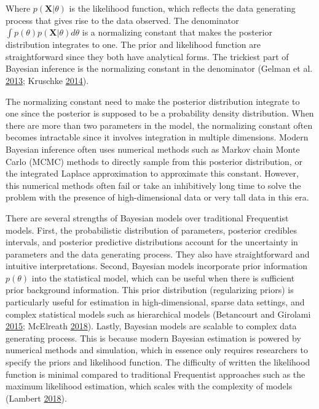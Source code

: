 \documentclass[12pt]{book}
\numberwithin{equation}{chapter}
\begin{document}
Where \(p(\mathbf{X}|\theta)\) is the likelihood function, which reflects the data generating process that gives rise to the data observed. The denominator \(\int p(\theta)p(\mathbf{X}|\theta)d\theta\) is a normalizing constant that makes the posterior distribution integrates to one. The prior and likelihood function are straightforward since they both have analytical forms. The trickiest part of Bayesian inference is the normalizing constant in the denominator (Gelman et al. \protect\hyperlink{ref-gelman2013bayesian}{2013}; Kruschke \protect\hyperlink{ref-kruschke2014doing}{2014}).

The normalizing constant need to make the posterior distribution integrate to one since the posterior is supposed to be a probability density distribution. When there are more than two parameters in the model, the normalizing constant often becomes intractable since it involves integration in multiple dimensions. Modern Bayesian inference often uses numerical methods such as Markov chain Monte Carlo (MCMC) methods to directly sample from this posterior distribution, or the integrated Laplace approximation to approximate this constant. However, this numerical methods often fail or take an inhibitively long time to solve the problem with the presence of high-dimensional data or very tall data in this era.

There are several strengths of Bayesian models over traditional Frequentist models. First, the probabilistic distribution of parameters, posterior credibles intervals, and posterior predictive distributions account for the uncertainty in parameters and the data generating process. They also have straightforward and intuitive interpretations. Second, Bayesian models incorporate prior information \(p(\theta)\) into the statistical model, which can be useful when there is sufficient prior background information. This prior distribution (regularizing priors) is particularly useful for estimation in high-dimensional, sparse data settings, and complex statistical models such as hierarchical models (Betancourt and Girolami \protect\hyperlink{ref-betancourt2015hamiltonian}{2015}; McElreath \protect\hyperlink{ref-mcelreath2018statistical}{2018}). Lastly, Bayesian models are scalable to complex data generating process. This is because modern Bayesian estimation is powered by numerical methods and simulation, which in essence only requires researchers to specify the priors and likelihood function. The difficulty of written the likelihood function is minimal compared to traditional Frequentist approaches such as the maximum likelihood estimation, which scales with the complexity of models (Lambert \protect\hyperlink{ref-lambert2018student}{2018}).
\end{document}
